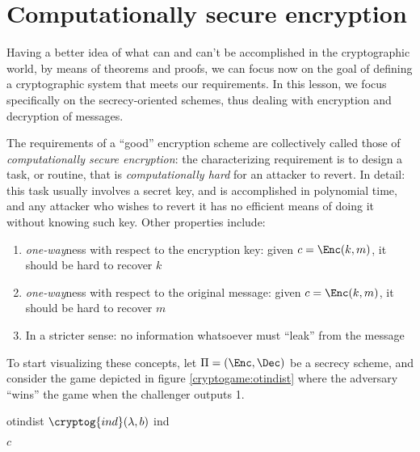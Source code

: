 
\section{Computationally secure encryption}

Having a better idea of what can and can't be accomplished in the cryptographic world, by means of theorems and proofs, we can focus now on the goal of defining a cryptographic system that meets our requirements. In this lesson, we focus specifically on the secrecy-oriented schemes, thus dealing with encryption and decryption of messages.

The requirements of a ``good'' encryption scheme are collectively called those of \emph{computationally secure encryption}: the characterizing requirement is to design a task, or routine, that is \emph{computationally hard} for an attacker to revert.
In detail: this task usually involves a secret key\footnotemark, and is accomplished in polynomial time, and any attacker who wishes to revert it has no efficient means of doing it without knowing such key. Other properties include:


\begin{enumerate}
    \item \label{prop:owk} \emph{one-way}ness with respect to the encryption key: given $c = \Enc(k, m)$, it should be hard to recover $k$
    \item \label{prop:owm} \emph{one-way}ness with respect to the original message: given $c = \Enc(k, m)$, it should be hard to recover $m$
    \item \label{prop:nol} In a stricter sense: no information whatsoever must ``leak'' from the message
\end{enumerate}

To start visualizing these concepts, let $\Pi = (\Enc, \Dec)$ be a secrecy scheme, and consider the game depicted in figure \ref{cryptogame:otindist}  where the adversary ``wins'' the game when the challenger outputs 1.

\begin{cryptogame}
    {otindist}
    {$\cryptog{ind}(\lambda, b)$}
    {ind}


    {$c$}{}

    \cseqdelay

    
\end{cryptogame}

